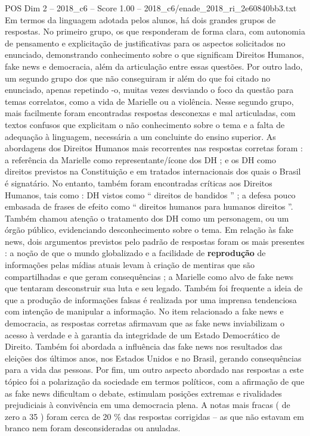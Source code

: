 \begin{textsample}{POS Dim 2 – 2018\_c6 – Score 1.00 – 2018\_c6/enade\_2018\_ri\_2e60840bb3.txt}
Em termos da linguagem adotada pelos alunos, há dois grandes grupos de respostas.
No primeiro grupo, os que responderam de forma clara, com autonomia de pensamento e explicitação de justificativas para os aspectos solicitados no enunciado, demonstrando conhecimento sobre o que significam Direitos Humanos, fake news e democracia, além da articulação entre essas questões.
Por outro lado, um segundo grupo dos que não conseguiram ir além do que foi citado no enunciado, apenas repetindo -o, muitas vezes desviando o foco da questão para temas correlatos, como a vida de Marielle ou a violência.
Nesse segundo grupo, mais facilmente foram encontradas respostas desconexas e mal articuladas, com textos confusos que explicitam o não conhecimento sobre o tema e a falta de adequação à linguagem, necessária a um concluinte do ensino superior.
As abordagens dos Direitos Humanos mais recorrentes nas respostas corretas foram : a referência da Marielle como representante/ícone dos DH ; e os DH como direitos previstos na Constituição e em tratados internacionais dos quais o Brasil é signatário.
No entanto, também foram encontradas críticas aos Direitos Humanos, tais como : DH vistos como “ direitos de bandidos ” ; a defesa pouco embasada de frases de efeito como “ direitos humanos para humanos direitos ”.
Também chamou atenção o tratamento dos DH como um personagem, ou um órgão público, evidenciando desconhecimento sobre o tema.
Em relação às fake news, dois argumentos previstos pelo padrão de respostas foram os mais presentes : a noção de que o mundo globalizado e a facilidade de \textbf{reprodução} de informações pelas mídias atuais levam à criação de mentiras que são compartilhadas e que geram consequências ; a Marielle como alvo de fake news que tentaram desconstruir sua luta e seu legado.
Também foi frequente a ideia de que a produção de informações falsas é realizada por uma imprensa tendenciosa com intenção de manipular a informação.
No item relacionado a fake news e democracia, as respostas corretas afirmavam que as fake news inviabilizam o acesso à verdade e à garantia da integridade de um Estado Democrático de Direito.
Também foi abordada a influência das fake news nos resultados das eleições dos últimos anos, nos Estados Unidos e no Brasil, gerando consequências para a vida das pessoas.
Por fim, um outro aspecto abordado nas respostas a este tópico foi a polarização da sociedade em termos políticos, com a afirmação de que as fake news dificultam o debate, estimulam posições extremas e rivalidades prejudiciais à convivência em uma democracia plena.
A notas mais fracas ( de zero a 35 ) foram cerca de 20 \% das respostas corrigidas – as que não estavam em branco nem foram desconsideradas ou anuladas.

\end{textsample}
